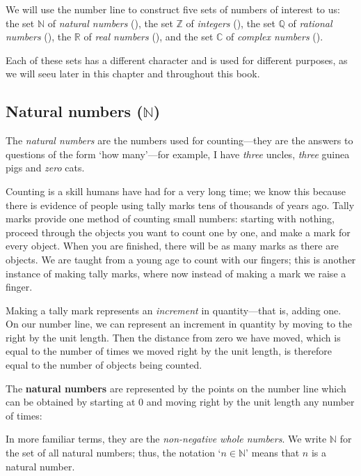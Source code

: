 We will use the number line to construct five sets of numbers of interest to us: the set $\mathbb{N}$ of \textit{natural numbers} (), the set $\mathbb{Z}$ of \textit{integers} (), the set $\mathbb{Q}$ of \textit{rational numbers} (), the $\mathbb{R}$ of \textit{real numbers} (), and
the set $\mathbb{C}$ of \textit{complex numbers} ().

Each of these sets has a different character and is used for different purposes, as we will seeu later in this chapter and throughout this book.

\subsection*{Natural numbers ($\mathbb{N}$)}

The \textit{natural numbers} are the numbers used for counting---they are the answers to questions of the form `how many'---for example, I have \textit{three} uncles, \textit{three} guinea pigs and \textit{zero} cats.

Counting is a skill humans have had for a very long time; we know this because there is evidence of people using tally marks tens of thousands of years ago. Tally marks provide one method of counting small numbers: starting with nothing, proceed through the objects you want to count one by one, and make a mark for every object. When you are finished, there will be as many marks as there are objects. We are taught from a young age to count with our fingers; this is another instance of making tally marks, where now instead of making a mark we raise a finger.

Making a tally mark represents an \textit{increment} in quantity---that is, adding one. On our number line, we can represent an increment in quantity by moving to the right by the unit length. Then the distance from zero we have moved, which is equal to the number of times we moved right by the unit length, is therefore equal to the number of objects being counted.

\begin{definition}
\label{defNaturalNumbersInformal}
The \textbf{natural numbers} are represented by the points on the number line which can be obtained by starting at $0$ and moving right by the unit length any number of times:
\begin{center}
\end{center}
In more familiar terms, they are the \textit{non-negative whole numbers}. We write $\mathbb{N}$  for the set of all natural numbers; thus, the notation `$n \in \mathbb{N}$' means that $n$ is a natural number.
\end{definition}

